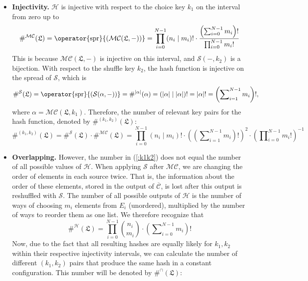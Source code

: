 \documentclass[12pt, a4paper]{article}
\newcommand{\C}{\mathcal{C}}
\newcommand{\CC}{\overline{\mathcal{C}}}
\renewcommand{\H}{\mathcal{H}}
\renewcommand{\S}{\mathcal{S}}
\newcommand{\M}{\mathcal{M}}
\newcommand{\conf}{\mathfrak{L}}
\newcommand{\spr}[1]{\operator{\mathrm{spr}}{\left(#1\right)}}
\begin{document}
\begin{itemize}
    \item \textbf{Injectivity.}
        $ \H $ is injective with respect to the choice key $ k_1 $ on the interval from zero up to
        \begin{equation}
            \#^{\M\C}(\conf) = \spr{\M\C(\conf, -)} = \prod\limits_{i = 0}^{N-1} (n_i \mid m_i)! \cdot \frac{\left( \sum\nolimits_{i = 0}^{N-1} m_i \right)!}{\prod\nolimits_{i = 0}^{N-1} m_i!}
        \end{equation}
        This is because $ \M\C(\conf, -) $ is injective on this interval, and $ \S(-, k_2) $ is a bijection. With respect to the shuffle key $ k_2 $, the hash function is injective on the spread of $ \S $, which is
        \begin{equation}
            \#^{\S}(\conf) = \spr{\S(\alpha, -)} = \#^{|\alpha|}(\alpha) = (|\alpha| \mid |\alpha|)! = |\alpha|! = \left( \sum\nolimits_{i = 1}^{N-1} m_i \right)!,
        \end{equation}
        where $ \alpha = \M\C(\conf, k_1) $. Therefore, the number of relevant key pairs for the hash function, denoted by $ \#^{(k_1, k_2)}(\conf) $:
        \begin{equation}\label{:k1k2}
            \#^{(k_1, k_2)}(\conf) = \#^{\S}(\conf) \cdot \#^{\M\C}(\conf) = \prod\limits_{i = 0}^{N-1} (n_i \mid m_i)! \cdot \left(\left( \sum\nolimits_{i = 1}^{N-1} m_i \right)!\right)^2 \cdot \left( \prod\nolimits_{i = 0}^{N-1} m_i! \right)^{-1}
        \end{equation}
    \item \textbf{Overlapping.}
        However, the number in (\ref{:k1k2}) does not equal the number of all possible values of $ \H $. When applying $ \S $ after $ \M\C $, we are changing the order of elements in each source twice. That is, the information about the order of these elements, stored in the output of $ \CC $, is lost after this output is reshuffled with $ \S $. The number of all possible outputs of $ \H $ is the number of ways of choosing $ m_i $ elements from $ E_i $ (unordered), multiplied by the number of ways to reorder them as one list. We therefore recognize that
        \begin{equation}\label{:H}
            \#^{\H}(\conf) = \prod\limits_{i = 0}^{N-1} {{n_i}\choose{m_i}} \cdot \left(\sum\nolimits_{i = 0}^{N-1} m_i\right)!
        \end{equation}
        Now, due to the fact that all resulting hashes are equally likely for $ k_1, k_2 $ within their respective injectivity intervals, we can calculate the number of different $ (k_1, k_2) $ pairs that produce the same hash in a constant configuration. This number will be denoted by $ \#^{\cap}(\conf) $:

\end{itemize}
\end{document}
